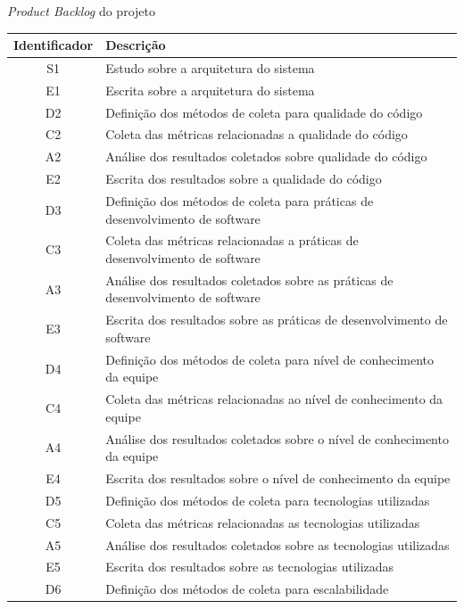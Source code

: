 \begin{quadro}
    \caption{\textit{Product Backlog} do projeto\label{quad:ProductBacklog}}
    \begin{tabular}{ | c | m{12cm} | }
    \hline
        \textbf{Identificador} &
        \textbf{Descrição} \\ \hline
        S1 & Estudo sobre a arquitetura do sistema \\ \hline
        E1 & Escrita sobre a arquitetura do sistema \\ \hline
        D2 & Definição dos métodos de coleta para qualidade do código \\ \hline
        C2 & Coleta das métricas relacionadas a qualidade do código \\ \hline
        A2 & Análise dos resultados coletados sobre qualidade do código \\ \hline
        E2 & Escrita dos resultados sobre a qualidade do código \\ \hline
        D3 & Definição dos métodos de coleta para práticas de desenvolvimento de software \\ \hline
        C3 & Coleta das métricas relacionadas a práticas de desenvolvimento de software \\ \hline
        A3 & Análise dos resultados coletados sobre as práticas de desenvolvimento de software \\ \hline
        E3 & Escrita dos resultados sobre as práticas de desenvolvimento de software \\ \hline
        D4 & Definição dos métodos de coleta para nível de conhecimento da equipe \\ \hline
        C4 & Coleta das métricas relacionadas ao nível de conhecimento da equipe \\ \hline
        A4 & Análise dos resultados coletados sobre o nível de conhecimento da equipe \\ \hline
        E4 & Escrita dos resultados sobre o nível de conhecimento da equipe \\ \hline
        D5 & Definição dos métodos de coleta para tecnologias utilizadas \\ \hline
        C5 & Coleta das métricas relacionadas as tecnologias utilizadas \\ \hline
        A5 & Análise dos resultados coletados sobre as tecnologias utilizadas \\ \hline
        E5 & Escrita dos resultados sobre as tecnologias utilizadas \\ \hline
        D6 & Definição dos métodos de coleta para escalabilidade \\ \hline

\end{tabular}
\end{quadro}
